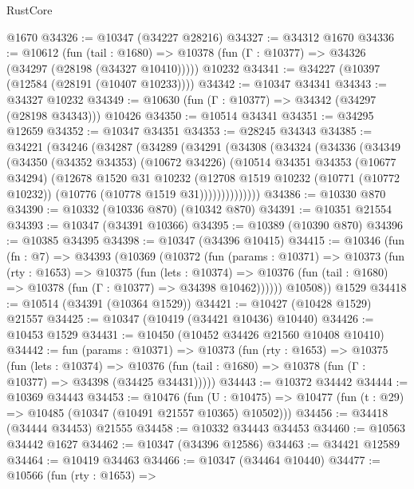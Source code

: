 \begin{lexlean}{RustCore}
\begin{coremodule}
    @1670
@34326 := @10347 (@34227 @28216)
@34327 := @34312 @1670
@34336 := @10612
    (fun (tail : @1680) => @10378 (fun (Γ : @10377) => @34326 (@34297 (@28198 (@34327 @10410)))))
    @10232
@34341 := @34227 (@10397 (@12584 (@28191 (@10407 @10233))))
@34342 := @10347 @34341
@34343 := @34327 @10232
@34349 := @10630 (fun (Γ : @10377) => @34342 (@34297 (@28198 @34343))) @10426
@34350 := @10514 @34341
@34351 := @34295 @12659
@34352 := @10347 @34351
@34353 := @28245 @34343
@34385 := @34221
    (@34246
      (@34287
        (@34289
          (@34291
            (@34308
              (@34324
                (@34336
                  (@34349
                    (@34350
                      (@34352 @34353)
                      (@10672 @34226)
                      (@10514
                        @34351
                        @34353
                        (@10677 @34294)
                        (@12678
                          @1520
                          @31
                          @10232
                          (@12708
                            @1519
                            @10232
                            (@10771 (@10772 @10232))
                            (@10776 (@10778 @1519 @31))))))))))))))
@34386 := @10330 @870
@34390 := @10332 (@10336 @870) (@10342 @870)
@34391 := @10351 @21554
@34393 := @10347 (@34391 @10366)
@34395 := @10389 (@10390 @870)
@34396 := @10385 @34395
@34398 := @10347 (@34396 @10415)
@34415 := @10346
    (fun (fn : @7) =>
    @34393
      (@10369
        (@10372
          (fun (params : @10371) =>
          @10373
            (fun (rty : @1653) =>
            @10375
              (fun (lets : @10374) =>
              @10376 (fun (tail : @1680) => @10378 (fun (Γ : @10377) => @34398 @10462))))))
        @10508))
    @1529
@34418 := @10514 (@34391 (@10364 @1529))
@34421 := @10427 (@10428 @1529) @21557
@34425 := @10347 (@10419 (@34421 @10436) @10440)
@34426 := @10453 @1529
@34431 := @10450 (@10452 @34426 @21560 @10408 @10410)
@34442 := fun (params : @10371) =>
  @10373
    (fun (rty : @1653) =>
    @10375
      (fun (lets : @10374) =>
      @10376 (fun (tail : @1680) => @10378 (fun (Γ : @10377) => @34398 (@34425 @34431)))))
@34443 := @10372 @34442
@34444 := @10369 @34443
@34453 := @10476
    (fun (U : @10475) => @10477 (fun (t : @29) => @10485 (@10347 (@10491 @21557 @10365) @10502)))
@34456 := @34418 (@34444 @34453) @21555
@34458 := @10332 @34443 @34453
@34460 := @10563 @34442 @1627
@34462 := @10347 (@34396 @12586)
@34463 := @34421 @12589
@34464 := @10419 @34463
@34466 := @10347 (@34464 @10440)
@34477 := @10566
    (fun (rty : @1653) =>

\end{coremodule}
\end{lexlean}
